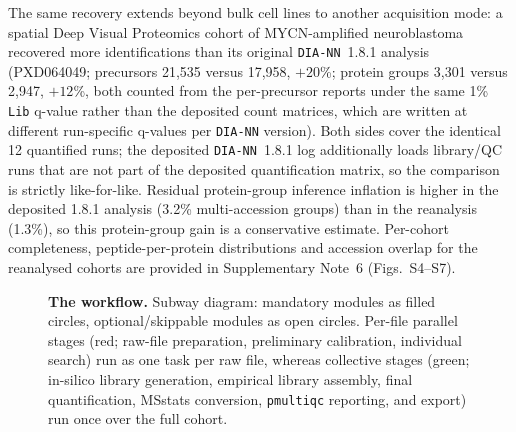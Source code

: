 \documentclass[preprint,12pt]{elsarticle}
\begin{document}
The same recovery extends beyond bulk cell lines to another acquisition mode: a spatial Deep Visual Proteomics cohort of MYCN-amplified neuroblastoma recovered more identifications than its original \texttt{DIA-NN}~1.8.1 analysis (PXD064049; precursors 21{,}535 versus 17{,}958, $+20$\%; protein groups 3{,}301 versus 2{,}947, $+12$\%, both counted from the per-precursor reports under the same 1\% \texttt{Lib} q-value rather than the deposited count matrices, which are written at different run-specific q-values per \texttt{DIA-NN} version). Both sides cover the identical 12 quantified runs; the deposited \texttt{DIA-NN}~1.8.1 log additionally loads library/QC runs that are not part of the deposited quantification matrix, so the comparison is strictly like-for-like. Residual protein-group inference inflation is higher in the deposited 1.8.1 analysis (3.2\% multi-accession groups) than in the reanalysis (1.3\%), so this protein-group gain is a conservative estimate. Per-cohort completeness, peptide-per-protein distributions and accession overlap for the reanalysed cohorts are provided in Supplementary Note~6 (Figs.~S4--S7).


\begin{figure}[htbp]
  \centering
  \caption[The quantmsdiann workflow]{%
    \textbf{The \quantmsdiann{} workflow.} Subway diagram: mandatory modules as
    filled circles, optional/skippable modules as open circles. Per-file parallel
    stages (red; raw-file preparation, preliminary calibration, individual search)
    run as one task per raw file, whereas collective stages (green; in-silico
    library generation, empirical library assembly, final quantification, MSstats
    conversion, \texttt{pmultiqc} reporting, and \qpx{} export) run once over the
    full cohort.
  }
  \label{fig:architecture}
\end{figure}
\end{document}

